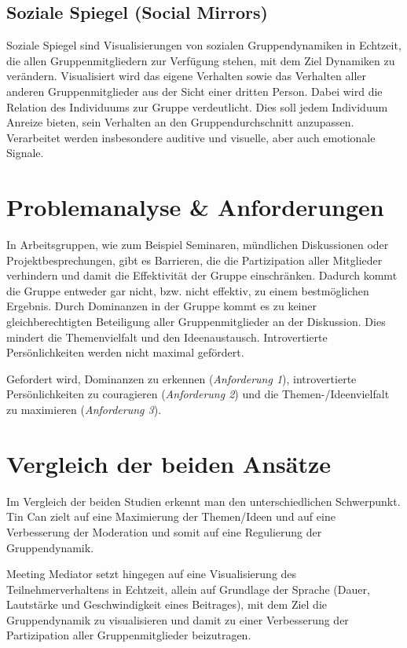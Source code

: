 \documentclass{seminarvorlage}
\begin{document}
\subsection{Soziale Spiegel (Social Mirrors)}
Soziale Spiegel \cite{BergKara2009-2} sind Visualisierungen von sozialen
Gruppendynamiken in Echtzeit, die allen Gruppenmitgliedern zur Verfügung stehen,
mit dem Ziel Dynamiken zu ver\-änd\-ern. Visualisiert wird das eigene Verhalten
sowie das Verhalten aller anderen Gruppenmitglieder aus der Sicht einer dritten
Person. Dabei wird die Relation des Individuums zur Gruppe verdeutlicht. Dies
soll jedem Individuum Anreize bieten, sein Verhalten an den Gruppendurchschnitt
anzupassen. Verarbeitet werden insbesondere auditive und visuelle, aber
auch emotionale Signale.

\section{Problemanalyse \& Anforderungen}
In Arbeitsgruppen, wie zum Beispiel Seminaren, münd\-lich\-en Diskussionen oder
Projektbesprechungen, gibt es Barrieren, die die Partizipation aller
Mitglieder verhindern und damit die Effektivität der Gruppe einschränken.
Dadurch kommt die Gruppe entweder gar nicht, bzw. nicht effektiv, zu einem
best\-mög\-lich\-en Ergebnis. Durch Dominanzen in der Gruppe kommt es zu
keiner gleichberechtigten Beteiligung aller Gruppenmitglieder an der Diskussion.
Dies mindert die Themenvielfalt und den Ideenaustausch. Introvertierte
Per\-sön\-lich\-keit\-en werden nicht maximal gefördert.

Gefordert wird, Dominanzen zu erkennen ({\em Anforderung 1}), introvertierte Per\-sön\-lich\-keit\-en
zu couragieren ({\em Anforderung 2}) und die Themen-/\-Ideen\-vielfalt zu maximieren ({\em Anforderung 3}).




\section{Vergleich der beiden Ansätze}
Im Vergleich der beiden Studien erkennt man den unterschiedlichen Schwerpunkt.
Tin Can \cite{HarGorSch2012} zielt auf eine Maximierung der Themen/Ideen und auf
eine Verbesserung der Moderation und somit auf eine Regulierung der Gruppendynamik.

Meeting Mediator \cite{KimChaHolPent2008} setzt hingegen auf eine
Visualisierung des Teilnehmerverhaltens in Echtzeit, allein auf Grundlage der Sprache (Dauer,
Lautstärke und Geschwindigkeit eines Beitrages), mit dem Ziel die Gruppendynamik zu
visualisieren und damit zu einer Verbesserung der Partizipation aller
Gruppenmitglieder beizutragen.
\end{document}
